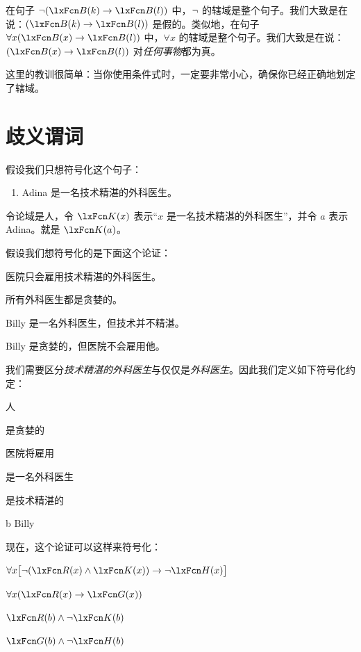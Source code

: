 在句子 $\enot(\atom{B}{k} \eif \atom{B}{l})$ 中，$\neg$ 的辖域是整个句子。我们大致是在说：$(\atom{B}{k} \eif \atom{B}{l})$ 是假的。类似地，在句子 $\forall x (\atom{B}{x} \eif \atom{B}{l})$ 中，$\forall x$ 的辖域是整个句子。我们大致是在说：$(\atom{B}{x} \eif \atom{B}{l})$ 对\emph{任何事物}都为真。

这里的教训很简单：当你使用条件式时，一定要非常小心，确保你已经正确地划定了辖域。

\section{歧义谓词}

假设我们只想符号化这个句子：


\begin{enumerate}
\item\label{surgeon1} Adina 是一名技术精湛的外科医生。
\end{enumerate}


令论域是人，令 $\atom{K}{x}$ 表示“$x$ 是一名技术精湛的外科医生”，并令 $a$ 表示 Adina。就是 $\atom{K}{a}$。

假设我们想符号化的是下面这个论证：


\begin{earg}
\item 医院只会雇用技术精湛的外科医生。
\item 所有外科医生都是贪婪的。
\item Billy 是一名外科医生，但技术并不精湛。
\item[\texttherefore] Billy 是贪婪的，但医院不会雇用他。
\end{earg}


我们需要区分\emph{技术精湛的外科医生}与仅仅是\emph{外科医生}。因此我们定义如下符号化约定：


\begin{ekey}
\item[\text{论域}] 人
\item[\atom{G}{x}]  是贪婪的
\item[\atom{H}{x}] 医院将雇用 
\item[\atom{R}{x}]  是一名外科医生
\item[\atom{K}{x}]  是技术精湛的
\item[b] Billy
\end{ekey}

现在，这个论证可以这样来符号化：


\begin{earg}
\label{surgeon2}
\item[] $\forall x\bigl[\enot (\atom{R}{x} \eand \atom{K}{x}) \eif \enot \atom{H}{x}\bigr]$
\item[] $\forall x(\atom{R}{x} \eif \atom{G}{x})$
\item[] $\atom{R}{b} \eand \enot \atom{K}{b}$
\item[\texttherefore] $\atom{G}{b} \eand \enot \atom{H}{b}$
\end{earg}


